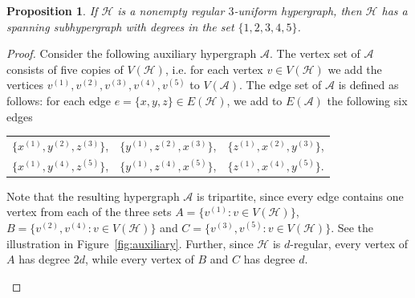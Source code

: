 \documentclass[11pt, a4paper]{article}
\numberwithin{theorem}{section} %
\newtheorem{proposition}[theorem]{Proposition}
\theoremstyle{remark}
\theoremstyle{definition}
\def\cA{\mathcal{A}}
\def\cH{\mathcal{H}}
\begin{document}
\begin{proposition}\label{prop:5-shallow}
If $\cH$ is a nonempty regular $3$-uniform hypergraph, then $\cH$ has a spanning subhypergraph with degrees in the set $\{1, 2, 3, 4, 5\}$.
\end{proposition}
\begin{proof}
Consider the following auxiliary hypergraph $\cA$. The vertex set of $\cA$ consists of five copies of $V(\cH)$, i.e. for each vertex $v\in V(\cH)$ we add the vertices $v^{(1)}, v^{(2)}, v^{(3)}, v^{(4)}, v^{(5)}$ to $V(\cA)$. The edge set of $\cA$ is defined as follows: for each edge $e=\{x, y, z\}\in E(\cH)$, we add to $E(\cA)$ the following six edges
\begin{center}
\begin{tabular}{ccc}
$\{x^{(1)}, y^{(2)}, z^{(3)}\}$, & $\{y^{(1)}, z^{(2)}, x^{(3)}\}$, & $\{z^{(1)}, x^{(2)}, y^{(3)}\}$,\\
$\{x^{(1)}, y^{(4)}, z^{(5)}\}$, & $\{y^{(1)}, z^{(4)}, x^{(5)}\}$, & $\{z^{(1)}, x^{(4)}, y^{(5)}\}$.
\end{tabular}
\end{center}

Note that the resulting hypergraph $\cA$ is tripartite, since every edge contains one vertex from each of the three sets $A=\{v^{(1)}:v\in V(\cH)\}$, $B=\{v^{(2)}, v^{(4)}:v\in V(\cH)\}$ and $C=\{v^{(3)}, v^{(5)}:v\in V(\cH)\}$. See the illustration in Figure~\ref{fig:auxiliary}. Further, since $\cH$ is $d$-regular, every vertex of $A$ has degree $2d$, while every vertex of $B$ and $C$ has degree $d$. 

\begin{figure}[hbpt!]
  \begin{center}
\end{center}
\end{figure}
\end{proof}
\end{document}
